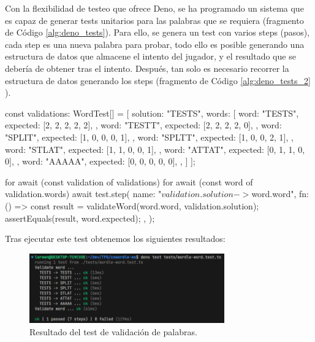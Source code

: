 Con la flexibilidad de testeo que ofrece Deno, se ha programado un sistema que es capaz de generar tests unitarios para las palabras que se requiera (fragmento de Código \ref{alg:deno_tests}). Para ello, se genera un test con varios steps (pasos), cada step es una nueva palabra para probar, todo ello es posible generando una estructura de datos que almacene el intento del jugador, y el resultado que se debería de obtener tras el intento. Después, tan solo es necesario recorrer la estructura de datos generando los steps (fragmento de Código \ref{alg:deno_tests_2} ).

\begin{mytypescript}[float={!h},caption={Implementación del sistema de creación de test automáticos.},label={alg:deno_tests}]
	const validations: WordTest[] = [
		{ solution: "TESTS", words: [
			{
				word: "TESTS",
				expected: [2, 2, 2, 2, 2],
			},
			{
				word: "TESTT",
				expected: [2, 2, 2, 2, 0],
			},
			{
				word: "SPLIT",
				expected: [1, 0, 0, 0, 1],
			},
			{
				word: "SPLTT",
				expected: [1, 0, 0, 2, 1],
			},
			{
				word: "STLAT",
				expected: [1, 1, 0, 0, 1],
			},
			{
				word: "ATTAT",
				expected: [0, 1, 1, 0, 0],
			},
			{
				word: "AAAAA",
				expected: [0, 0, 0, 0, 0],
			},
			]
		}
	];
\end{mytypescript}

\begin{mytypescript}[float={!h},caption={Implementación del sistema de creación de test automáticos.},label={alg:deno_tests_2}]
	for await (const validation of validations) {
		for await (const word of validation.words) {
			await test.step({
				name: "${validation.solution} -> ${word.word}",
				fn: () => {
					const result = validateWord(word.word, validation.solution);
					assertEquals(result, word.expected);
				},
			});
		}
	}
\end{mytypescript}

Tras ejecutar este test obtenemos los siguientes resultados:

\begin{figure}[H]
	\centering
	\includegraphics[clip=true, width=0.75\textwidth]{images/tests/deno_test_wordle.png}
	\caption{Resultado del test de validación de palabras.}
	\label{fig:deno_test}
\end{figure}

